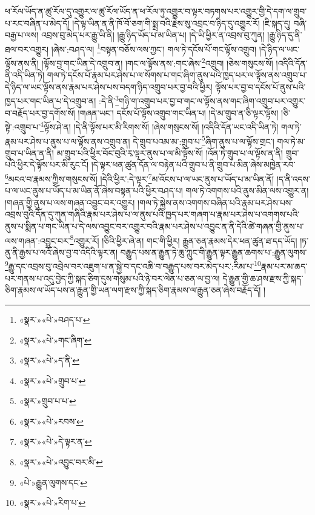 ཕ་རོལ་ཡོད་ན་ཚུ་རོལ་དུ་འགྱུར་ལ་ཚུ་རོལ་ཡོད་ན་ཕ་རོལ་ཏུ་འགྱུར་བ་ལྟར་བཏགས་པར་འགྱུར་གྱི་དེ་དག་ལ་གྲུབ་པ་རང་བཞིན་པ་མེད་དོ། །དེ་ལྟ་ཡིན་ན་ནི་ཁོ་བོ་ཅག་གི་སྨྲ་བའི་རྗེས་སུ་འབྲང་བ་ཉིད་དུ་འགྱུར་རོ། །ཇི་སྐད་དུ། བཞི་བརྒྱ་པ་ལས། འབྲས་བུ་མེད་པར་རྒྱུ་ཡི་ནི། །རྒྱུ་ཉིད་ཡོད་པ་མ་ཡིན་པ། །དེ་ཡི་ཕྱིར་ན་འབྲས་བུ་ཀུན། །རྒྱུ་ཉིད་དུ་ནི་ཐལ་བར་འགྱུར། །ཞེས་:བཤད་ལ། \footnote{«སྣར་»«པེ་»བཤད་པ་}བསྟན་བཅོས་ལས་ཀྱང་། གལ་ཏེ་དངོས་པོ་གང་ལྟོས་འགྲུབ། །དེ་ཉིད་ལ་ཡང་ལྟོས་ནས་ནི། །ལྟོས་བྱ་གང་ཡིན་དེ་འགྲུབ་ན། །གང་ལ་ལྟོས་ནས་:གང་ཞེས་\footnote{«སྣར་»«པེ་»གང་ཞིག་}འགྲུབ། །ཅེས་གསུངས་སོ། །འདིའི་དོན་ནི་འདི་ཡིན་ཏེ། གལ་ཏེ་དངོས་པོ་རྣམ་པར་ཤེས་པ་ལ་སོགས་པ་གང་ཞིག་ནུས་པའི་ཁྱད་པར་ལ་ལྟོས་ནས་འགྲུབ་པ་དེ་ཉིད་ལ་ཡང་ལྟོས་ནས་རྣམ་པར་ཤེས་པས་བདག་ཉིད་འགྲུབ་པར་བྱ་བའི་ཕྱིར། ལྟོས་པར་བྱ་བ་དངོས་པོ་ནུས་པའི་ཁྱད་པར་གང་ཡིན་པ་དེ་འགྲུབ་ན། :དེ་ནི་\footnote{«སྣར་»«པེ་»ད་ནི་}གཉི་ག་འགྲུབ་པར་བྱ་བ་གང་ལ་ལྟོས་ནས་གང་ཞིག་འགྲུབ་པར་འགྱུར་བ་བརྗོད་པར་བྱ་དགོས་སོ། །གཞན་ཡང་། དངོས་པོ་ལྟོས་འགྲུབ་གང་ཡིན་པ། །དེ་མ་གྲུབ་ན་ཅི་ལྟར་ལྟོས། །ཅི་སྟེ་:འགྲུབ་པ་\footnote{«སྣར་»«པེ་»གྲུབ་པ་}ལྟོས་ཤེ་ན། །དེ་ནི་ལྟོས་པར་མི་རིགས་སོ། །ཞེས་གསུངས་སོ། །འདིའི་དོན་ཡང་འདི་ཡིན་ཏེ། གལ་ཏེ་རྣམ་པར་ཤེས་པ་ནུས་པ་ལ་ལྟོས་ནས་འགྲུབ་ན། དེ་གྲུབ་པའམ་མ་:གྲུབ་པ་\footnote{«སྣར་»གྲུབ་པ་པ་}ཞིག་ནུས་པ་ལ་ལྟོས་གྲང་། གལ་ཏེ་མ་གྲུབ་པ་ཡིན་ན་ནི། མ་གྲུབ་པའི་ཕྱིར་བོང་བུའི་རྭ་ལྟར་ནུས་པ་ལ་མི་ལྟོས་སོ། །འོན་ཏེ་གྲུབ་པ་ལ་ལྟོས་ན་ནི། གྲུབ་པའི་ཕྱིར་དེ་ལྟོས་པར་མི་རུང་ངོ། །དེ་ལྟར་ཕན་ཚུན་དོན་ལ་བརྟེན་པའི་གྲུབ་པ་ནི་གྲུབ་པ་མིན་ཞེས་མཁྱེན་རབ་\footnote{«སྣར་»«པེ་»རབས་}མངའ་བ་རྣམས་ཀྱིས་གསུངས་སོ། །དེའི་ཕྱིར་:དེ་ལྟར་\footnote{«སྣར་»«པེ་»དེ་ལྟར་ན་}མ་འོངས་པ་ལ་ཡང་ནུས་པ་ཡོད་པ་མ་ཡིན་ནོ། །ད་ནི་འདས་པ་ལ་ཡང་ནུས་པ་ཡོད་པ་མ་ཡིན་ནོ་ཞེས་བསྟན་པའི་ཕྱིར་བཤད་པ། གལ་ཏེ་འགགས་པའི་ནུས་མིན་ལས་འགྱུར་ན། །གཞན་གྱི་ནུས་པ་ལས་གཞན་འབྱུང་བར་འགྱུར། །གལ་ཏེ་སྐྱེས་ནས་འགགས་བཞིན་པའི་རྣམ་པར་ཤེས་པས་འབྲས་བུའི་དོན་དུ་ཀུན་གཞིའི་རྣམ་པར་ཤེས་པ་ལ་ནུས་པའི་ཁྱད་པར་གཞག་པ་རྣམ་པར་ཤེས་པ་འགགས་པའི་ནུས་པ་སྨིན་པ་གང་ཡིན་པ་དེ་ལས་འབྱུང་བར་འགྱུར་བའི་རྣམ་པར་ཤེས་པ་འབྱུང་ན་ནི་དེའི་ཚེ་གཞན་གྱི་ནུས་པ་ལས་གཞན་:འབྱུང་བར་\footnote{«སྣར་»«པེ་»འབྱུང་བར་མི་}འགྱུར་རོ། །ཅིའི་ཕྱིར་ཞེ་ན། གང་གི་ཕྱིར། རྒྱུན་ཅན་རྣམས་དེར་ཕན་ཚུན་ཐ་དད་ཡོད། །ཏ་ནུ་ནི་རྒྱས་པ་ལའོ་ཞེས་བྱ་བ་འདིའི་ལྟར་ན། བརྒྱུད་པས་ན་རྒྱུན་ཏེ་ཆུ་ཀླུང་གི་རྒྱུན་ལྟར་རྒྱུན་ཆགས་པ་:རྒྱུན་ལུགས་\footnote{«པེ་»རྒྱུན་ལུགས་དང་}རྒྱུ་དང་འབྲས་བུ་འབྲེལ་བར་འཇུག་པ་ན་སྐྱེ་བ་དང་འཆི་བ་བརྒྱུད་པས་བར་མེད་པར་:རིམ་པ་\footnote{«སྣར་»«པེ་»རིག་པ་}རྣམ་པར་མ་ཆད་པར་གནས་པ་འདུ་བྱེད་ཀྱི་སྐད་ཅིག་དུས་གསུམ་པའི་ཉེ་བར་ལེན་པ་ཅན་ལ་བྱ་ལ། དེ་རྒྱུན་གྱི་ཆ་ཤས་རྫས་ཀྱི་སྐད་ཅིག་རྣམས་ལ་ཡོད་པས་ན་རྒྱུན་གྱི་ཡན་ལག་རྫས་ཀྱི་སྐད་ཅིག་རྣམས་ལ་རྒྱུན་ཅན་ཞེས་བརྗོད་དོ། །
